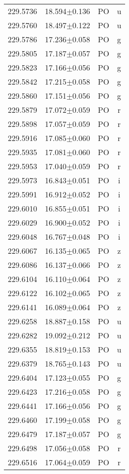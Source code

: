 \begin{table}
\begin{tabular}{cccc}
229.5736 & 18.594$\pm$0.136 & PO & u \\
229.5760 & 18.497$\pm$0.122 & PO & u \\
229.5786 & 17.236$\pm$0.058 & PO & g \\
229.5805 & 17.187$\pm$0.057 & PO & g \\
229.5823 & 17.166$\pm$0.056 & PO & g \\
229.5842 & 17.215$\pm$0.058 & PO & g \\
229.5860 & 17.151$\pm$0.056 & PO & g \\
229.5879 & 17.072$\pm$0.059 & PO & r \\
229.5898 & 17.057$\pm$0.059 & PO & r \\
229.5916 & 17.085$\pm$0.060 & PO & r \\
229.5935 & 17.081$\pm$0.060 & PO & r \\
229.5953 & 17.040$\pm$0.059 & PO & r \\
229.5973 & 16.843$\pm$0.051 & PO & i \\
229.5991 & 16.912$\pm$0.052 & PO & i \\
229.6010 & 16.855$\pm$0.051 & PO & i \\
229.6029 & 16.900$\pm$0.052 & PO & i \\
229.6048 & 16.767$\pm$0.048 & PO & i \\
229.6067 & 16.135$\pm$0.065 & PO & z \\
229.6086 & 16.137$\pm$0.066 & PO & z \\
229.6104 & 16.110$\pm$0.064 & PO & z \\
229.6122 & 16.102$\pm$0.065 & PO & z \\
229.6141 & 16.089$\pm$0.064 & PO & z \\
229.6258 & 18.887$\pm$0.158 & PO & u \\
229.6282 & 19.092$\pm$0.212 & PO & u \\
229.6355 & 18.819$\pm$0.153 & PO & u \\
229.6379 & 18.765$\pm$0.143 & PO & u \\
229.6404 & 17.123$\pm$0.055 & PO & g \\
229.6423 & 17.216$\pm$0.058 & PO & g \\
229.6441 & 17.166$\pm$0.056 & PO & g \\
229.6460 & 17.199$\pm$0.058 & PO & g \\
229.6479 & 17.187$\pm$0.057 & PO & g \\
229.6498 & 17.056$\pm$0.058 & PO & r \\
229.6516 & 17.064$\pm$0.059 & PO & r \\

\end{tabular}
\end{table}

